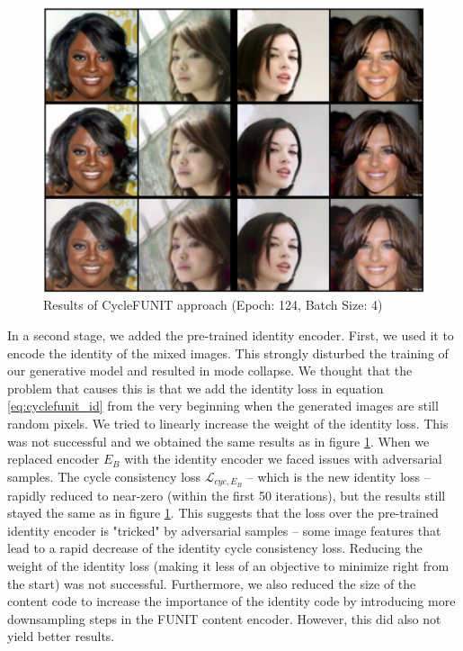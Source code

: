 \documentclass[conference]{IEEEtran}
\begin{document}
\begin{figure}[h!]
	\centering
	\includegraphics[width=\linewidth]{figures/cycle_funit.png}
	\caption{Results of CycleFUNIT approach (Epoch: 124, Batch Size: 4)}
	\label{fig:cycle_funit_results}
\end{figure}

In a second stage, we added the pre-trained identity encoder. First, we used it to encode the identity of the mixed images. This strongly disturbed the training of our generative model and resulted in mode collapse. We thought that the problem that causes this is that we add the identity loss in equation \ref{eq:cyclefunit_id} from the very beginning when the generated images are still random pixels. We tried to linearly increase the weight of the identity loss. This was not successful and we obtained the same results as in figure \ref{fig:cycle_funit_results}.
When we replaced encoder $E_B$ with the identity encoder we faced issues with adversarial samples. The cycle consistency loss $\mathcal{L}_{cyc, E_B}$ -- which is the new identity loss -- rapidly reduced to near-zero (within the first 50 iterations), but the results still stayed the same as in figure \ref{fig:cycle_funit_results}. This suggests that the loss over the pre-trained identity encoder is "tricked" by adversarial samples -- some image features that lead to a rapid decrease of the identity cycle consistency loss. Reducing the weight of the identity loss (making it less of an objective to minimize right from the start) was not successful. Furthermore, we also reduced the size of the content code to increase the importance of the identity code by introducing more downsampling steps in the FUNIT content encoder. However, this did also not yield better results. 
\end{document}
